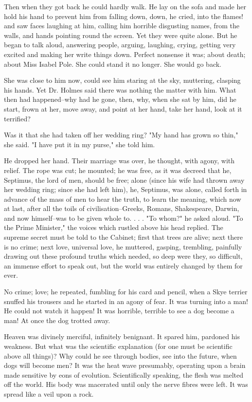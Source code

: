 \documentclass[lang=cn,10pt]{elegantbook}
\begin{document}
Then when they got back he could hardly walk.  He lay on the sofa
and made her hold his hand to prevent him from falling down, down,
he cried, into the flames! and saw faces laughing at him, calling
him horrible disgusting names, from the walls, and hands pointing
round the screen.  Yet they were quite alone.  But he began to talk
aloud, answering people, arguing, laughing, crying, getting very
excited and making her write things down.  Perfect nonsense it was;
about death; about Miss Isabel Pole.  She could stand it no longer.
She would go back.

She was close to him now, could see him staring at the sky,
muttering, clasping his hands.  Yet Dr. Holmes said there was
nothing the matter with him.  What then had happened--why had he
gone, then, why, when she sat by him, did he start, frown at her,
move away, and point at her hand, take her hand, look at it
terrified?

Was it that she had taken off her wedding ring?  "My hand has grown
so thin," she said.  "I have put it in my purse," she told him.

He dropped her hand.  Their marriage was over, he thought, with
agony, with relief.  The rope was cut; he mounted; he was free, as
it was decreed that he, Septimus, the lord of men, should be free;
alone (since his wife had thrown away her wedding ring; since she
had left him), he, Septimus, was alone, called forth in advance of
the mass of men to hear the truth, to learn the meaning, which now
at last, after all the toils of civilisation--Greeks, Romans,
Shakespeare, Darwin, and now himself--was to be given whole to. . . .
"To whom?" he asked aloud.  "To the Prime Minister," the voices
which rustled above his head replied.  The supreme secret must be
told to the Cabinet; first that trees are alive; next there is no
crime; next love, universal love, he muttered, gasping, trembling,
painfully drawing out these profound truths which needed, so deep
were they, so difficult, an immense effort to speak out, but the
world was entirely changed by them for ever.

No crime; love; he repeated, fumbling for his card and pencil, when
a Skye terrier snuffed his trousers and he started in an agony of
fear.  It was turning into a man!  He could not watch it happen!
It was horrible, terrible to see a dog become a man!  At once the
dog trotted away.

Heaven was divinely merciful, infinitely benignant.  It spared him,
pardoned his weakness.  But what was the scientific explanation
(for one must be scientific above all things)?  Why could he see
through bodies, see into the future, when dogs will become men?  It
was the heat wave presumably, operating upon a brain made sensitive
by eons of evolution.  Scientifically speaking, the flesh was
melted off the world.  His body was macerated until only the nerve
fibres were left.  It was spread like a veil upon a rock.
\end{document}
